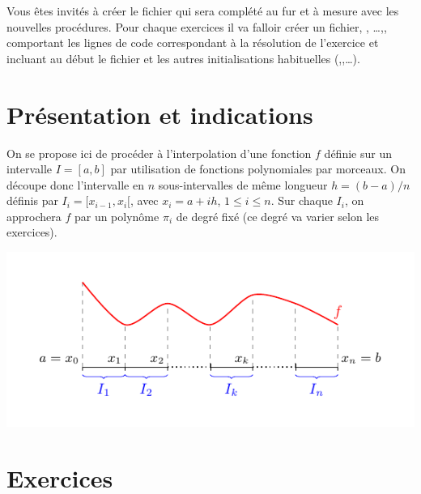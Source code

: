 \documentclass[a4paper,12pt,reqno]{amsart}
\begin{document}

Vous êtes invités à créer le fichier  qui sera complété au fur et à mesure avec les nouvelles procédures. Pour chaque exercices il va falloir créer un fichier, , \dots ,, comportant les lignes de code correspondant à la résolution de l'exercice et incluant au début le fichier  et les autres initialisations habituelles (,,\dots).\\[1ex]



\section{Présentation et indications}

On se propose ici de procéder à l'interpolation d'une fonction $f$ définie sur un intervalle $I=[a,b]$ par utilisation de fonctions polynomiales par morceaux. On découpe donc l'intervalle en $n$ sous-intervalles de même longueur $h=(b-a)/n$ définis par $I_i=[x_{i-1},x_{i}[$, avec $x_i=a+ih$, $1 \leq i \leq n$. Sur chaque $I_i$, on approchera $f$ par un polynôme $\pi_{i}$ de degré fixé (ce degré va varier selon les exercices).

\begin{center}
  \includegraphics[width=15cm]{FonctionParMorceaux}
\end{center}


\section{Exercices}
\end{document}
